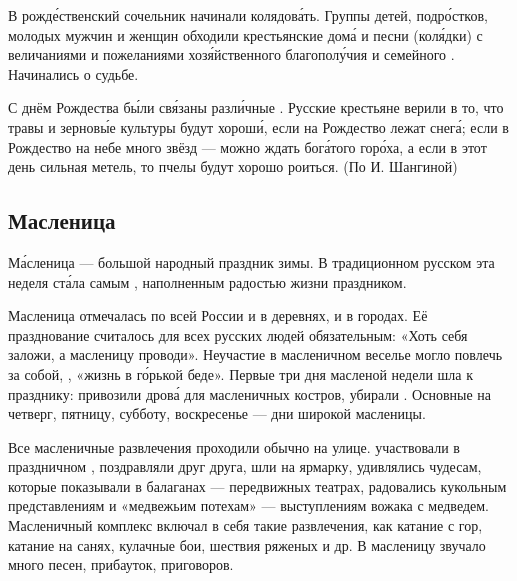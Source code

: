 В рожд\'{е}ственский сочельник начинали колядов\'{а}ть. Группы детей, подр\'{о}стков, молодых мужчин и женщин обходили крестьянские дом\'{а} и  песни (кол\'{я}дки) с величаниями и пожеланиями хоз\'{я}йственного благопол\'{у}чия и семейного . Начинались  о судьбе.

С днём Рождества б\'{ы}ли св\'{я}заны разл\'{и}чные .
Русские крестьяне верили в то, что травы и зернов\'{ы}е культуры будут хорош\'{и}, если на Рождество лежат  снег\'{а}; если в Рождество на небе много звёзд --- можно ждать бог\'{а}того  гор\'{о}ха, а если в этот день сильная метель, то пчелы будут хорошо роиться. (По И. Шангиной)


\subsection{Масленица}
М\'{а}сленица --- большой народный праздник  зимы. В традиционном русском  эта неделя ст\'{а}ла самым , наполненным радостью жизни праздником.

Масленица отмечалась по всей России и в деревнях, и в городах. Её празднование считалось для всех русских людей обязательным: «Хоть себя заложи, а масленицу проводи». Неучастие в масленичном веселье могло повлечь за собой, , «жизнь в г\'{о}рькой беде».
Первые три дня масленой недели шла  к празднику: привозили дров\'{а} для масленичных костров, убирали . Основные   на четверг, пятницу, субботу, воскресенье --- дни широкой масленицы.

Все масленичные развлечения проходили обычно на улице.  участвовали в праздничном , поздравляли друг друга, шли на ярмарку, удивлялись чудесам, которые показывали в балаганах --- передвижных театрах, радовались кукольным представлениям и «медвежьим потехам» --- выступлениям вожака с медведем. Масленичный комплекс включал в себя такие развлечения, как катание с гор, катание на санях, кулачные бои, шествия ряженых и др. В масленицу звучало много песен, прибауток, приговоров.

